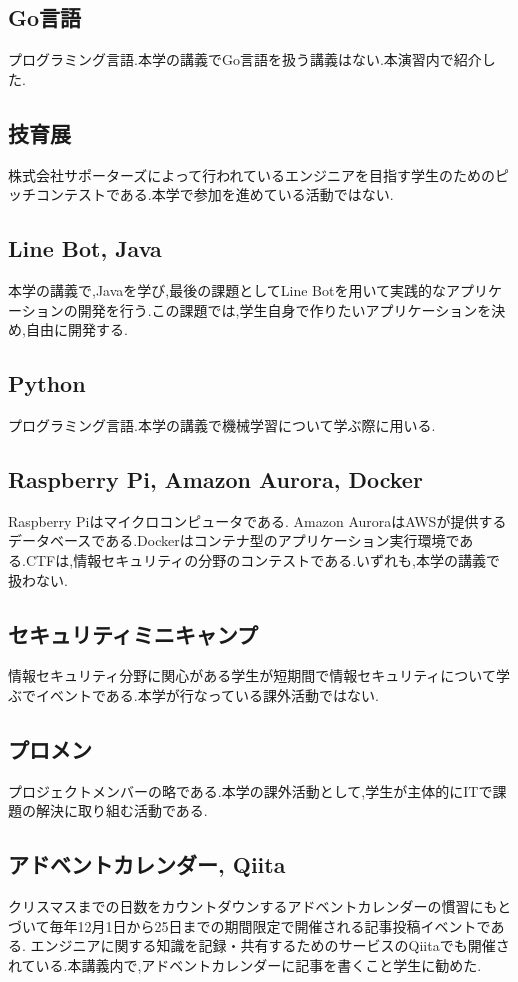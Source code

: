 \documentclass[11pt, a4paper]{jreport}
\begin{document}
\subsection{Go言語}

プログラミング言語.本学の講義でGo言語を扱う講義はない.本演習内で紹介した.

\subsection{技育展}

株式会社サポーターズによって行われているエンジニアを目指す学生のためのピッチコンテストである.本学で参加を進めている活動ではない.

\subsection{Line Bot, Java}

本学の講義で,Javaを学び,最後の課題としてLine Botを用いて実践的なアプリケーションの開発を行う.この課題では,学生自身で作りたいアプリケーションを決め,自由に開発する.

\subsection{Python}

プログラミング言語.本学の講義で機械学習について学ぶ際に用いる.

\subsection{Raspberry Pi, Amazon Aurora, Docker}

Raspberry Piはマイクロコンピュータである. Amazon AuroraはAWSが提供するデータベースである.Dockerはコンテナ型のアプリケーション実行環境である.CTFは,情報セキュリティの分野のコンテストである.いずれも,本学の講義で扱わない.

\subsection{セキュリティミニキャンプ}

情報セキュリティ分野に関心がある学生が短期間で情報セキュリティについて学ぶでイベントである.本学が行なっている課外活動ではない.

\subsection{プロメン}

プロジェクトメンバーの略である.本学の課外活動として,学生が主体的にITで課題の解決に取り組む活動である.

\subsection{アドベントカレンダー, Qiita}

クリスマスまでの日数をカウントダウンするアドベントカレンダーの慣習にもとづいて毎年12月1日から25日までの期間限定で開催される記事投稿イベントである. エンジニアに関する知識を記録・共有するためのサービスのQiitaでも開催されている.本講義内で,アドベントカレンダーに記事を書くこと学生に勧めた.
\end{document}
